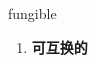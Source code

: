 
\begin{frame}
{\huge fungible}
\begin{center}
\begin{enumerate}\Large
  \item \textbf{可互换的}
\end{enumerate}
\end{center}
\end{frame}
